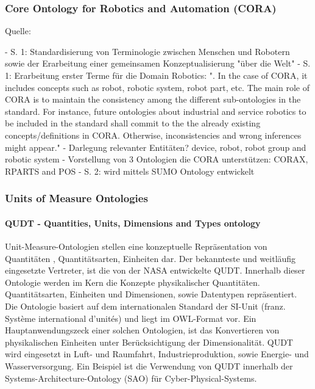 \documentclass{article}
\begin{document}
\subsubsection{Core Ontology for Robotics and Automation (CORA)}

Quelle: \cite{prestes2014core}

- S. 1: Standardisierung von Terminologie zwischen Menschen und Robotern sowie der Erarbeitung einer gemeinsamen Konzeptualisierung "über die Welt"
- S. 1: Erarbeitung erster Terme für die Domain Robotics: ". In the case of CORA, it includes concepts such as robot, robotic system, robot part, etc. The main role of CORA is to maintain the consistency among the different sub-ontologies in the standard. For instance, future ontologies about industrial and service robotics to be included in the standard shall commit to the the already existing concepts/definitions in CORA. Otherwise, inconsistencies and wrong inferences might appear."
- Darlegung relevanter Entitäten? device, robot, robot group and robotic system
- Vorstellung von 3 Ontologien die CORA unterstützen: CORAX, RPARTS and POS
- S. 2: wird mittels SUMO Ontology entwickelt


\subsubsection{Units of Measure Ontologies}

\paragraph{QUDT - Quantities, Units, Dimensions and Types ontology}
\vspace{1em} 

Unit-Measure-Ontologien stellen eine konzeptuelle Repräsentation von Quantitäten , Quantitätsarten, Einheiten dar. Der bekannteste und weitläufig eingesetzte Vertreter, ist die von der NASA entwickelte QUDT\cite{QUDTOntology}. Innerhalb dieser Ontologie werden im Kern die Konzepte physikalischer Quantitäten. Quantitätsarten, Einheiten und Dimensionen, sowie Datentypen repräsentiert. Die Ontologie basiert auf dem internationalen Standard der SI-Unit (franz. Système international d'unités) und liegt im OWL-Format vor. Ein Hauptanwendungszeck einer solchen Ontologien, ist das Konvertieren von physikalischen  Einheiten unter Berücksichtigung der Dimensionalität.
QUDT wird eingesetzt in Luft- und Raumfahrt, Industrieproduktion, sowie Energie- und Wasserversorgung. Ein Beispiel ist die Verwendung von QUDT innerhalb der Systems-Architecture-Ontology (SAO) für Cyber-Physical-Systems.
\end{document}
